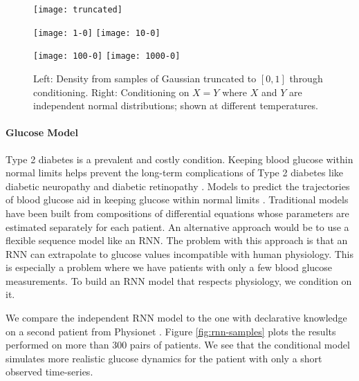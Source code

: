 \begin{figure}[!htb]
\centering
\begin{minipage}{0.45\linewidth}
\texttt{[image: truncated]}
\end{minipage}%
\begin{minipage}{0.45\linewidth}
	\texttt{[image: 1-0]}
	\texttt{[image: 10-0]}
	
	\texttt{[image: 100-0]}
	\texttt{[image: 1000-0]}				
	
	\end{minipage}
	\caption{Left: Density from samples of Gaussian truncated to $[0, 1]$ through conditioning. Right: Conditioning on $X = Y$ where $X$ and $Y$ are independent normal distributions; shown at different temperatures.}
	\label{fig:density}
\end{figure}


\paragraph{Glucose Model}
Type 2 diabetes is a prevalent and costly condition.
Keeping blood glucose within normal limits helps prevent the
long-term complications of Type 2 diabetes like diabetic neuropathy and diabetic retinopathy \citep{brownlee2006glycemic}. Models to predict the trajectories of blood glucose aid in keeping glucose within
normal limits \citep{zeevi2015personalized}. Traditional models have been built from compositions of differential equations \citep{albers2017personalized,levine2017offline} whose parameters are estimated separately for each patient. An alternative approach would be to use a flexible sequence model like an RNN. The problem with this approach is that an RNN can extrapolate to glucose values incompatible with human physiology. This is especially a problem where we have patients with only a few blood glucose measurements. To build an RNN model that respects physiology, we condition on it.

We compare the independent RNN model to the one with declarative knowledge on a second patient from Physionet \citep{moody2001physionet}.
Figure \ref{fig:rnn-samples} plots the results performed on more than 300 pairs of patients.
We see that the conditional model simulates
more realistic glucose dynamics for the patient 
with only a short observed time-series.

